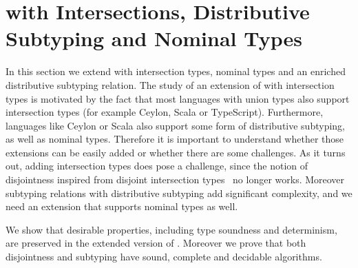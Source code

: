 \section{\name with Intersections, Distributive Subtyping and Nominal Types}
\label{sec:inter}
In this section we extend \name with intersection types, nominal types
and an enriched distributive subtyping relation.
The study of an
extension of \name with intersection types is motivated by the fact
that most languages with union types also support intersection types (for example Ceylon, Scala or TypeScript).
Furthermore, languages like Ceylon or Scala also support some form
of distributive subtyping, as well as nominal types.
Therefore it is important to understand whether those extensions
can be easily added or whether there are some challenges.
As it turns out, adding intersection types does pose a challenge,
since the notion of disjointness inspired from disjoint intersection types~\citep{oliveira2016disjoint}
no longer works. Moreover subtyping relations with distributive subtyping
add significant complexity, and we need an extension that supports nominal types as well.
\begin{comment}
Fortunately, the alternative specification presented in
\Cref{sec:union:discussion} comes to the rescue. Furthermore, we show how to obtain
an algorithmic formulation of disjointness based on a novel notion
called \emph{lowest ordinary subtypes}.

We also add a simple form of nominal types along with intersection types.
Nominal types are an interesting and significantly
important extension of \name, illustrating
that the disjointness approach works for structural types
as well as nominal types.
\end{comment}
We show that desirable properties, including
type soundness and determinism, are preserved in the extended version of \name.
Moreover we prove that both disjointness and subtyping have sound, complete and decidable algorithms.



